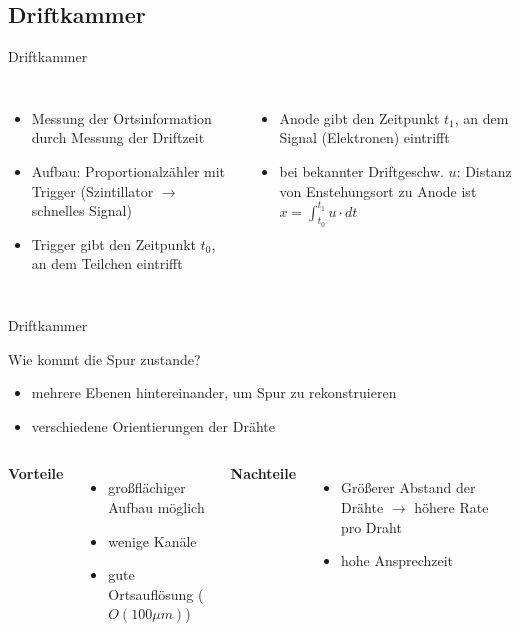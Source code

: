 \subsection[]{Driftkammer}

\begin{frame}{Driftkammer}
    \begin{columns}[T]
	    	\begin{itemize}
	    	  \item Messung der Ortsinformation durch Messung der Driftzeit
			  \item Aufbau: Proportionalzähler mit Trigger (Szintillator $\rightarrow$ schnelles Signal)
			  \item Trigger gibt den Zeitpunkt $t_0$, an dem Teilchen eintrifft
			\end{itemize}
			
	    	\begin{itemize}
			  \item Anode gibt den Zeitpunkt $t_1$, an dem Signal (Elektronen) eintrifft
			  \item bei bekannter Driftgeschw. $u$: Distanz von Enstehungsort zu Anode ist
			  $x=\int_{t_0}^{t_1}u\cdot dt$
			\end{itemize}
    \end{columns}

	\begin{figure}[htbp]
	  	\centering
		
	\end{figure}
\end{frame}

\begin{frame}{Driftkammer}

	\begin{block}{Wie kommt die Spur zustande?}
		\begin{itemize}
		  \item mehrere Ebenen hintereinander, um Spur zu rekonstruieren
		  \item verschiedene Orientierungen der Drähte
		\end{itemize}
	\end{block}
	\vspace{0.8cm}
    \begin{columns}[T]
			\textbf{Vorteile}		
			\begin{itemize}
			  \item großflächiger Aufbau möglich
			  \item wenige Kanäle
			  \item gute Ortsauflösung ($O(100\mu m)$)
			\end{itemize}	
	    	\textbf{Nachteile}
	    	\begin{itemize}
			  \item Größerer Abstand der Drähte $\rightarrow$ höhere Rate pro Draht 
			  \item hohe Ansprechzeit
			\end{itemize}
    \end{columns}
    \vspace{1cm}
\end{frame}

